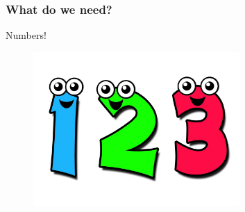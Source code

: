 \documentclass{beamer}
\begin{document}
\begin{frame}\frametitle{What do we need?}
  \centering
  Numbers!
  \begin{figure}
  \includegraphics[width=0.7\textwidth]{numbers}

  \end{figure}

\end{frame}
\end{document}
